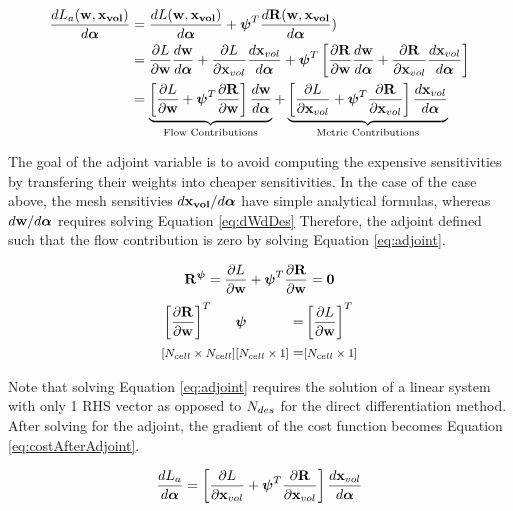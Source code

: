 \documentclass[letterpaper,12pt,]{article}
\begin{document}
\begin{equation}
\begin{split}
	\dfrac{dL_a( \mathbf{w}, \mathbf{x_{vol}} )}{d\boldsymbol{\alpha}} &= 
	\dfrac{dL( \mathbf{w}, \mathbf{x_{vol}} )}{d\boldsymbol{\alpha}} +
	\boldsymbol{\psi}^T
	\dfrac{d\mathbf{R}( \mathbf{w}, \mathbf{x_{vol}} }{d\boldsymbol{\alpha}})
\\
	&= 
    \dfrac{\partial L}{\partial\mathbf{w}}
	\dfrac{d\mathbf{w}}{d\boldsymbol{\alpha}}
	+
	\dfrac{\partial L}{\partial\mathbf{x}_{vol}}
	\dfrac{d\mathbf{x}_{vol}}{d\boldsymbol{\alpha}}
	+ 
	\boldsymbol{\psi}^T
	\left[
		\dfrac{\partial\mathbf{R}}{\partial\mathbf{w}}
		\dfrac{d\mathbf{w}}{d\boldsymbol{\alpha}}
		+
		\dfrac{\partial\mathbf{R}}{\partial\mathbf{x}_{vol}
	}
	\dfrac{d\mathbf{x}_{vol}}{d\boldsymbol{\alpha}}
	\right]
\\
	&=
    \underbrace
    {
		\left[
			\dfrac{\partial L}{\partial\mathbf{w}}
			+
			\boldsymbol{\psi}^T
			\dfrac{\partial\mathbf{R}}{\partial\mathbf{w}}
		\right]
		\dfrac{d\mathbf{w}}{d\boldsymbol{\alpha}}
    }
    _
    {
        \text{Flow Contributions}
    }
	+
    \underbrace
    {
		\left[
			\dfrac{\partial L}{\partial\mathbf{x}_{vol}}
			+
			\boldsymbol{\psi}^T
			\dfrac{\partial\mathbf{R}}{\partial\mathbf{x}_{vol}}
		\right]
		\dfrac{d\mathbf{x}_{vol}}{d\boldsymbol{\alpha}}
    }
    _
    {
        \text{Metric Contributions}
    }
	\label{eq:adjointDerivation}
\end{split}
\end{equation}

The goal of the adjoint variable is to avoid computing the expensive sensitivities by transfering their weights into cheaper sensitivities.
In the case of the case above, the mesh sensitivies ${d\mathbf{x_{vol}}}/{d\boldsymbol{\alpha}}$ have simple analytical formulas, whereas ${d\mathbf{w}}/{d\boldsymbol{\alpha}}$ requires solving Equation \ref{eq:dWdDes}
Therefore, the adjoint defined such that the flow contribution is zero by solving Equation \ref{eq:adjoint}.

\begin{equation}
	\mathbf{R}^{\boldsymbol{\psi}} =
	\dfrac{\partial L}{\partial\mathbf{w}}
	+
	\boldsymbol{\psi}^T
	\dfrac{\partial\mathbf{R}}{\partial\mathbf{w}}
	= \mathbf{0}
\end{equation}
\begin{equation}
\begin{alignedat}{4}
	&\left[\dfrac{\partial\mathbf{R}}{\partial\mathbf{w}}\right]^T
	&&\boldsymbol{\psi}
	&&=
	&&\left[\dfrac{\partial L}{\partial\mathbf{w}}\right]^T
\\	
	& \text{\footnotesize$\left[ N_{cell} \times N_{cell} \right]$}
	&& \text{\footnotesize$\left[ N_{cell} \times 1 \right]$}
	&&=
	&& \text{\footnotesize$\left[ N_{cell} \times 1 \right]$}
\label{eq:adjoint}
\end{alignedat}
\end{equation}

Note that solving Equation \ref{eq:adjoint} requires the solution of a linear system with only 1 RHS vector as opposed to $N_{des}$ for the direct differentiation method.
After solving for the adjoint, the gradient of the cost function becomes Equation \ref{eq:costAfterAdjoint}.

\begin{equation}
	\dfrac{dL_a}{d\boldsymbol{\alpha}} = 
	\left[
		\dfrac{\partial L}{\partial\mathbf{x}_{vol}}
		+
		\boldsymbol{\psi}^T
		\dfrac{\partial\mathbf{R}}{\partial\mathbf{x}_{vol}}
	\right]
	\dfrac{d\mathbf{x}_{vol}}{d\boldsymbol{\alpha}}
	\label{eq:costAfterAdjoint}
\end{equation}
\end{document}
